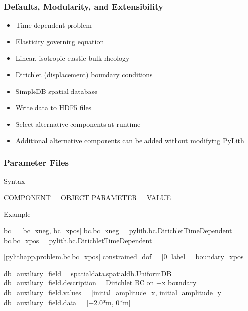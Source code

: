 \documentclass[aspectratio=169]{beamer}
\begin{document}
\begin{frame}
  \frametitle{Defaults, Modularity, and Extensibility}
  \summary{}

  \begin{itemize}
    \begin{itemize}
    \item Time-dependent problem
    \item Elasticity governing equation
    \item Linear, isotropic elastic bulk rheology
    \item Dirichlet (displacement) boundary conditions
    \end{itemize}
    \begin{itemize}
    \item SimpleDB spatial database
    \item Write data to HDF5 files
    \end{itemize}
    \begin{itemize}
    \item Select alternative components at runtime
    \item Additional alternative components can be added without modifying PyLith
    \end{itemize}
  \end{itemize}
  
\end{frame}


\begin{frame}[fragile]
  \frametitle{Parameter Files}

  Syntax\vspace*{-4pt}%
  \begin{cfgcode}
    COMPONENT = OBJECT
    PARAMETER = VALUE
  \end{cfgcode}

  \vspace*{-0pt}%
  Example\vspace*{-4pt}%
  \begin{cfgcode}
      bc = [bc_xneg, bc_xpos]
      bc.bc_xneg = pylith.bc.DirichletTimeDependent
      bc.bc_xpos = pylith.bc.DirichletTimeDependent

      [pylithapp.problem.bc.bc_xpos]
      constrained_dof = [0]
      label = boundary_xpos

      db_auxiliary_field = spatialdata.spatialdb.UniformDB
      db_auxiliary_field.description = Dirichlet BC on +x boundary
      db_auxiliary_field.values = [initial_amplitude_x, initial_amplitude_y]
      db_auxiliary_field.data = [+2.0*m, 0*m]
    \end{cfgcode}
  
\end{frame}
\end{document}
